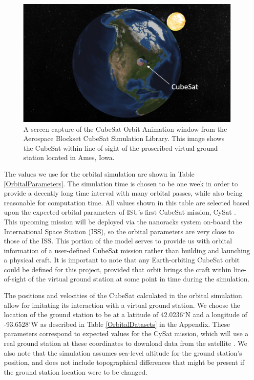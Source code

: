\documentclass[conf]{new-aiaa}
\begin{document}
\begin{figure}[!ht]
\centering
\includegraphics[width=.7\textwidth]{Fig/CubeSatModelScreenshot.png}
\caption{A screen capture of the CubeSat Orbit Animation window from the Aerospace Blockset CubeSat Simulation Library. This image shows the CubeSat within line-of-sight of the proscribed virtual ground station located in Ames, Iowa.}
\label{OrbitalAnimation}
\end{figure}

The values we use for the orbital simulation are shown in Table \ref{OrbitalParameters}. %
The simulation time is chosen to be one week in order to provide a decently long%
time interval with many orbital passes, while also being reasonable for computation time. All values shown in this table are selected based upon the expected orbital parameters of ISU's first CubeSat mission, CySat \cite{Nelson2020}. This upcoming mission will be deployed via the nanoracks system on-board the International Space Station (ISS), so the orbital parameters are very close to those of the ISS. This portion of the model serves to provide us with orbital information of a user-defined CubeSat mission rather than building and launching a physical craft. It is important to note that any Earth-orbiting CubeSat orbit %
could be defined for this project, provided that orbit brings the craft within line-of-sight of the virtual ground station at some point in time during the simulation. 

The positions and velocities of the CubeSat calculated in the orbital simulation allow for imitating its interaction with a virtual ground station. We choose the location of the ground station to be at a latitude of 42.0236$^{\circ}$N and a longitude of -93.6528$^{\circ}$W as described in Table \ref{OrbitalDatasets} in the Appendix. These parameters correspond to expected values for the CySat mission, which will use a real ground station at these coordinates to download data from the satellite \cite{Nelson2020}. We also note that the simulation assumes sea-level altitude for the ground station's position, and does not include topographical differences that might be present if the ground station location were to be changed.
\end{document}
